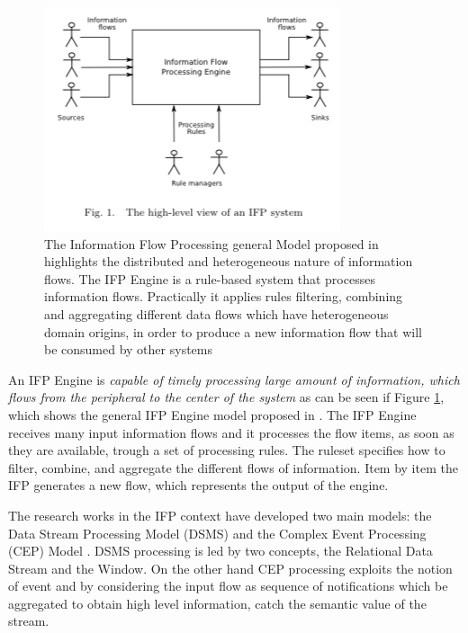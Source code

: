 \begin{figure}[tbh]
  \centering
	\includegraphics[width=0.75\linewidth]{images/ifp}
	\caption[IFP general Model]{The Information Flow Processing general Model proposed in \cite{Cugola:2012:PFI:2187671.2187677} highlights the distributed and heterogeneous nature of information flows. The IFP Engine is a rule-based system that processes information flows. Practically it applies rules filtering, combining and aggregating different data flows which have  heterogeneous domain origins, in order to produce a new information flow that will be consumed by other systems} 
  	\label{fig:ifp}
\end{figure}

An IFP Engine is \textit{capable of timely processing large amount of information, which flows from the peripheral to the center of the system} as can be seen if Figure \ref{fig:ifp}, which shows the general IFP Engine model proposed in \cite{Cugola:2012:PFI:2187671.2187677}. The IFP Engine receives many input information flows and it processes the flow items, as soon as they are available, trough a set of processing rules. The ruleset specifies how to filter, combine, and aggregate the different flows of information. Item by item the IFP generates a new flow, which represents the output of the engine.

The research works in the IFP context have developed two main models: the Data Stream Processing Model (DSMS) \cite{Babcock:2002:MID:543613.543615} and the Complex Event Processing (CEP) Model \cite{Luckham:2001:PEI:515781}. 
DSMS processing is led by two concepts, the Relational Data Stream and the Window. On the other hand  CEP processing exploits the notion of event and by considering the input flow as sequence of notifications which be aggregated to obtain high level information, catch the semantic value of the stream.

